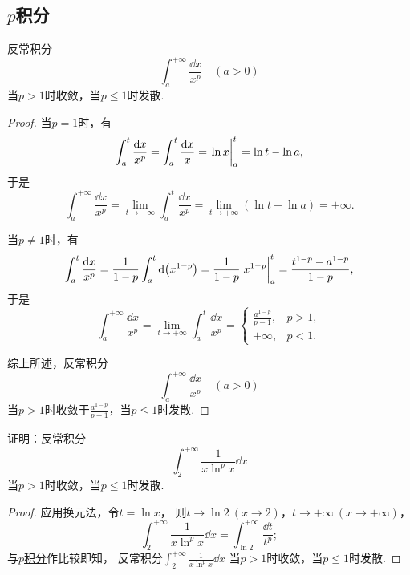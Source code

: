 \subsection{\texorpdfstring{\(p\)}{p}积分}
\begin{proposition}[\(p\)积分]\label{example:定积分.p积分}
反常积分\[
	\int_a^{+\infty} \frac{\dd{x}}{x^p}
	\quad(a>0)
\]当\(p>1\)时收敛，当\(p\leq1\)时发散.
\begin{proof}
当\(p=1\)时，有\[
	\int_a^t \frac{\dd{x}}{x^p}
	= \int_a^t \frac{\dd{x}}{x}
	= \eval{\ln x}_a^t
	= \ln t - \ln a,
\]
于是\[
	\int_a^{+\infty} \frac{\dd{x}}{x^p}
	= \lim_{t\to+\infty} \int_a^t \frac{\dd{x}}{x^p}
	= \lim_{t\to+\infty} (\ln t - \ln a)
	= +\infty.
\]

当\(p\neq1\)时，有\[
	\int_a^t \frac{\dd{x}}{x^p}
	= \frac{1}{1-p} \int_a^t \dd(x^{1-p})
	= \frac{1}{1-p} \eval{x^{1-p}}_a^t
	= \frac{t^{1-p}-a^{1-p}}{1-p},
\]
于是\[
	\int_a^{+\infty} \frac{\dd{x}}{x^p}
	= \lim_{t\to+\infty} \int_a^t \frac{\dd{x}}{x^p}
	= \left\{ \begin{array}{cl}
		\frac{a^{1-p}}{p-1}, & p>1, \\
		+\infty, & p<1.
	\end{array} \right.
\]

综上所述，反常积分\[
	\int_a^{+\infty} \frac{\dd{x}}{x^p}
	\quad(a>0)
\]当\(p>1\)时收敛于\(\frac{a^{1-p}}{p-1}\)，当\(p\leq1\)时发散.
\end{proof}
\end{proposition}

\begin{example}
证明：反常积分\[
	\int_2^{+\infty} \frac{1}{x \ln^p x} \dd{x}
\]
当\(p>1\)时收敛，当\(p\leq1\)时发散.
\begin{proof}
应用换元法，令\(t = \ln x\)，
则\(t \to \ln2\ (x\to2)\)，\(t \to +\infty\ (x\to+\infty)\)，
\[
	\int_2^{+\infty} \frac{1}{x \ln^p x} \dd{x}
	= \int_{\ln2}^{+\infty} \frac{\dd{t}}{t^p};
\]
与\hyperref[example:定积分.p积分]{\(p\)积分}作比较即知，
反常积分\(\int_2^{+\infty} \frac{1}{x \ln^p x} \dd{x}\)%
当\(p>1\)时收敛，当\(p\leq1\)时发散.
\end{proof}
\end{example}

